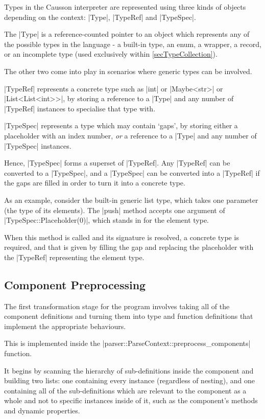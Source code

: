 \documentclass[11pt]{report}
\begin{document}
Types in the Causson interpreter are represented using three kinds of objects depending on the context: |Type|, |TypeRef| and |TypeSpec|.

The |Type| is a reference-counted pointer to an object which represents any of the possible types in the language - a built-in type, an enum, a wrapper, a record, or an incomplete type (used exclusively within \cref{secTypeCollection}).

The other two come into play in scenarios where generic types can be involved.

|TypeRef| represents a concrete type such as |int| or |Maybe<str>| or |List<List<int>>|, by storing a reference to a |Type| and any number of |TypeRef| instances to specialise that type with.

|TypeSpec| represents a type which may contain `gaps', by storing either a placeholder with an index number, \emph{or} a reference to a |Type| and any number of |TypeSpec| instances.

Hence, |TypeSpec| forms a superset of |TypeRef|. Any |TypeRef| can be converted to a |TypeSpec|, and a |TypeSpec| can be converted into a |TypeRef| if the gaps are filled in order to turn it into a concrete type.

As an example, consider the built-in generic list type, which takes one parameter (the type of its elements). The |push| method accepts one argument of |TypeSpec::Placeholder(0)|, which stands in for the element type.

When this method is called and its signature is resolved, a concrete type is required, and that is given by filling the gap and replacing the placeholder with the |TypeRef| representing the element type.

\subsection{Component Preprocessing} \label{secComponents}

The first transformation stage for the program involves taking all of the component definitions and turning them into type and function definitions that implement the appropriate behaviours.

This is implemented inside the |parser::ParseContext::preprocess_components| function.

It begins by scanning the hierarchy of sub-definitions inside the component and building two lists: one containing every instance (regardless of nesting), and one containing all of the sub-definitions which are relevant to the component as a whole and not to specific instances inside of it, such as the component's methods and dynamic properties.
\end{document}
